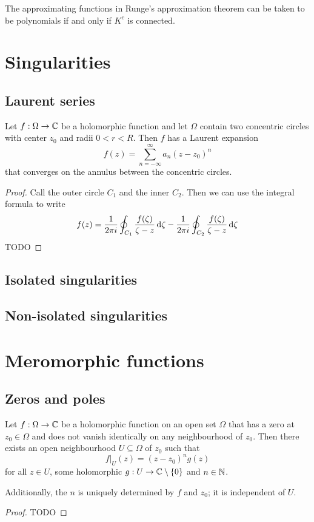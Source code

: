 \begin{proposition}
The approximating functions in Runge's approximation theorem can be taken to be polynomials \textup{if and only if} $K^c$ is connected.
\end{proposition}

\section{Singularities}
\subsection{Laurent series}
\begin{proposition}
Let $f:\Omega \to \mathbb{C}$ be a holomorphic function and let $\Omega$ contain two concentric circles with center $z_0$ and radii $0<r< R$. Then $f$ has a Laurent expansion
\[ f(z) = \sum_{n=-\infty}^{\infty}a_n(z-z_0)^n \]
that converges on the annulus between the concentric circles.
\end{proposition}
\begin{proof}
Call the outer circle $C_1$ and the inner $C_2$. Then we can use the integral formula to write
\[ f(z) = \frac{1}{2\pi i}\oint_{C_1}\frac{f(\zeta)}{\zeta - z}\operatorname{d \!}{\zeta} - \frac{1}{2\pi i}\oint_{C_2}\frac{f(\zeta)}{\zeta - z}\operatorname{d \!}{\zeta} \]
TODO
\end{proof}

\subsection{Isolated singularities}

\subsection{Non-isolated singularities}

\section{Meromorphic functions}
\subsection{Zeros and poles}
\begin{lemma} \label{holomorphicZeroLemma}
Let $f:\Omega\to \mathbb{C}$ be a holomorphic function on an open set $\Omega$ that has a zero at $z_0\in \Omega$ and does not vanish identically on any neighbourhood of $z_0$. Then there exists an open neighbourhood $U\subseteq \Omega$ of $z_0$ such that
\[ f|_U(z) = (z-z_0)^ng(z) \]
for all $z\in U$, some holomorphic $g:U\to \mathbb{C}\setminus\{0\}$ and $n\in \mathbb{N}$.

Additionally, the $n$ is uniquely determined by $f$ and $z_0$; it is independent of $U$.
\end{lemma}
\begin{proof}
TODO
\end{proof}

